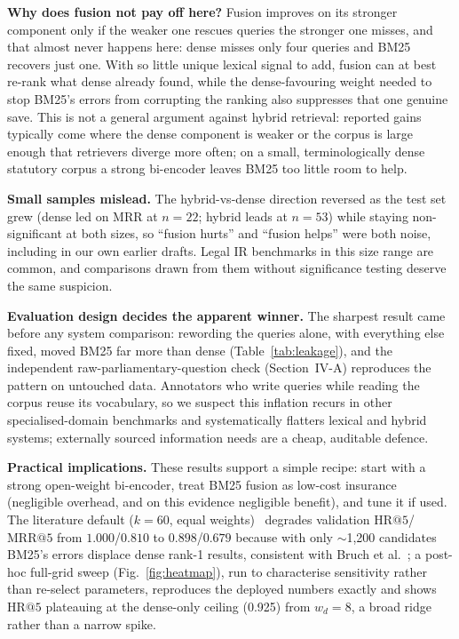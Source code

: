 \documentclass[conference,a4paper]{IEEEtran}
\makeatletter
\newcommand{\HR}[1]{\mathrm{HR}@{#1}}
\newcommand{\MRR}[1]{\mathrm{MRR}@{#1}}
\makeatother
\begin{document}
\textbf{Why does fusion not pay off here?}
Fusion improves on its stronger component only if the weaker one
rescues queries the stronger one misses, and that almost never
happens here: dense misses only four queries and BM25 recovers just
one.
With so little unique lexical signal to add, fusion can at best
re-rank what dense already found, while the dense-favouring weight
needed to stop BM25's errors from corrupting the ranking also
suppresses that one genuine save.
This is not a general argument against hybrid retrieval: reported
gains typically come where the dense component is weaker or the
corpus is large enough that retrievers diverge more often; on a
small, terminologically dense statutory corpus a strong bi-encoder
leaves BM25 too little room to help.

\textbf{Small samples mislead.}
The hybrid-vs-dense direction reversed as the test set grew (dense
led on MRR at $n{=}22$; hybrid leads at $n{=}53$) while staying
non-significant at both sizes, so ``fusion hurts'' and ``fusion
helps'' were both noise, including in our own earlier drafts.
Legal IR benchmarks in this size range are common, and comparisons
drawn from them without significance testing deserve the same
suspicion.

\textbf{Evaluation design decides the apparent winner.}
The sharpest result came before any system comparison: rewording the
queries alone, with everything else fixed, moved BM25 far more than
dense (Table~\ref{tab:leakage}), and the independent
raw-parliamentary-question check (Section~IV-A) reproduces the
pattern on untouched data.
Annotators who write queries while reading the corpus reuse its
vocabulary, so we suspect this inflation recurs in other
specialised-domain benchmarks and systematically flatters lexical and
hybrid systems; externally sourced information needs are a cheap,
auditable defence.

\textbf{Practical implications.}
These results support a simple recipe: start with a strong open-weight
bi-encoder, treat BM25 fusion as low-cost insurance (negligible
overhead, and on this evidence negligible benefit), and tune it if
used.
The literature default ($k{=}60$, equal weights)~\cite{14} degrades
validation $\HR{5}$/$\MRR{5}$ from $1.000$/$0.810$ to $0.898$/$0.679$
because with only $\sim$1{,}200 candidates BM25's errors displace
dense rank-1 results, consistent with Bruch et al.~\cite{20}; a
post-hoc full-grid sweep (Fig.~\ref{fig:heatmap}), run to characterise
sensitivity rather than re-select parameters, reproduces the deployed
numbers exactly and shows $\HR{5}$ plateauing at the dense-only
ceiling (0.925) from $w_d{=}8$, a broad ridge rather than a narrow
spike.
\end{document}
